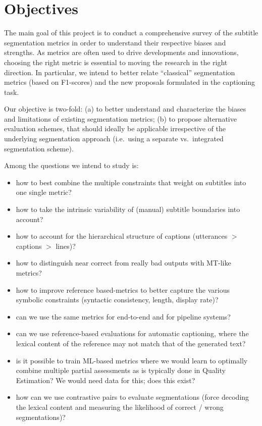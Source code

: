 \documentclass{article}
\begin{document}
\section{Objectives \label{sec:objectives}}

The main goal of this project is to conduct a comprehensive survey of the subtitle segmentation metrics in order to understand their respective biases and strengths. As metrics are often used to drive developments and innovations, choosing the right metric is essential to moving the research in the right direction. In particular, we intend to better relate ``classical'' segmentation metrics (based on F1-scores) and the new proposals formulated in the captioning task. 

Our objective is two-fold: (a) to better understand and characterize the biases and limitations of existing segmentation metrics; (b) to propose alternative evaluation schemes, that should ideally be applicable irrespective of the underlying segmentation approach (i.e.\ using a separate vs.\ integrated segmentation scheme).  

Among the questions we intend to study is:
\begin{itemize}
    \item how to best combine the multiple constraints that weight on subtitles into one single metric?
    \item how to take the intrinsic variability of (manual) subtitle boundaries into account?
    \item how to account for the hierarchical structure of captions (utterances $>$ captions $>$ lines)? 
    \item how to distinguish near correct from really bad outputs with MT-like metrics?
    \item how to improve reference based-metrics to better capture the various symbolic constraints (syntactic consistency, length, display rate)?
    \item can we use the same metrics for end-to-end and for pipeline systems?
    \item can we use reference-based evaluations for automatic captioning, where the lexical content of the reference may not match that of the generated text?
    \item is it possible to train ML-based metrics where we would learn to optimally combine multiple partial assessments as is typically done in Quality Estimation? We would need data for this; does this exist?
    \item how can we use contrastive pairs to evaluate segmentations (force decoding the lexical content and measuring the likelihood of correct / wrong segmentations)?
\end{itemize}
\end{document}
